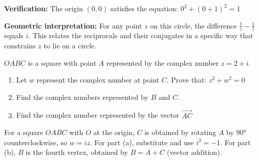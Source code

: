 \begin{solution}[Sketch]
\begin{center}
\end{center}
\vspace{0.5em}

\textbf{Verification:} The origin $(0,0)$ satisfies the equation: $0^2 + (0+1)^2 = 1$ \checkmark

\textbf{Geometric interpretation:} For any point $z$ on this circle, the difference $\frac{1}{z} - \frac{1}{\bar{z}}$ equals $i$. This relates the reciprocals and their conjugates in a specific way that constrains $z$ to lie on a circle.
\end{solution}

\begin{problem}
$OABC$ is a square with point $A$ represented by the complex number $z = 2 + i$.

\begin{enumerate}[label=\alph*),leftmargin=*]
    \item Let $w$ represent the complex number at point $C$. Prove that: $z^2 + w^2 = 0$
    \item Find the complex numbers represented by $B$ and $C$.
    \item Find the complex number represented by the vector $\overrightarrow{AC}$
\end{enumerate}
\end{problem}

\begin{hint}
For a square $OABC$ with $O$ at the origin, $C$ is obtained by rotating $A$ by $90°$ counterclockwise, so $w = iz$. For part (a), substitute and use $i^2 = -1$. For part (b), $B$ is the fourth vertex, obtained by $B = A + C$ (vector addition).
\end{hint}

